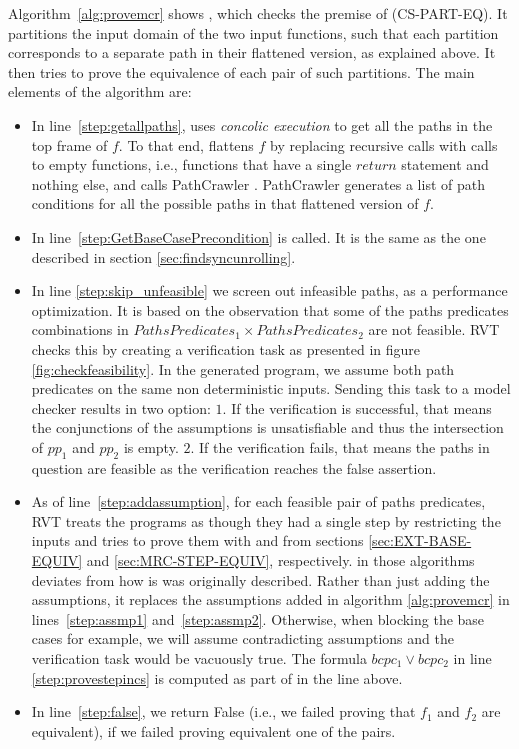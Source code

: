 Algorithm~\ref{alg:provemcr} shows 
, which checks the premise of (CS-PART-EQ). It partitions the input domain of the two input functions, such that each partition corresponds to a separate path in their flattened version, as explained above. It then tries to prove the equivalence of each pair of such partitions. The main elements of the algorithm are: 
\begin{itemize}
    \item In line~\ref{step:getallpaths},
     uses \emph{concolic execution} to get all the paths in the top frame of $f$. To that end,  flattens $f$ by replacing recursive calls with calls to empty functions, i.e., functions that have a single $return$ statement and nothing else, and calls PathCrawler \cite{10.1007/11408901_21}. PathCrawler generates a list of path conditions for all the possible paths in that flattened version of $f$.  
    \item In line~\ref{step:GetBaseCasePrecondition}  is called. It is the same as the one described in section \ref{sec:findsyncunrolling}.
    \item In line \ref{step:skip_unfeasible} we screen out infeasible paths, as a performance optimization. It is based on the observation that some of the paths predicates combinations in $PathsPredicates_1 \times PathsPredicates_2$ are not feasible. RVT checks this by creating a verification task as presented in figure \ref{fig:checkfeasibility}. In the generated program, we assume both path predicates on the same non deterministic inputs. Sending this task to a model checker results in two option: $1.$ If the verification is successful, that means the conjunctions of the assumptions is unsatisfiable and thus the intersection of $pp_1$ and $pp_2$ is empty. $2.$ If the verification fails, that means the paths in question are feasible as the verification reaches the false assertion.
    
    \item As of line~\ref{step:addassumption}, for each feasible pair of paths predicates, RVT treats the programs as though they had a single step by restricting the inputs and tries to prove them with  and  from sections \ref{sec:EXT-BASE-EQUIV} and \ref{sec:MRC-STEP-EQUIV}, respectively.  in those algorithms deviates from how is was originally described. Rather than just adding the assumptions, it replaces the assumptions added in algorithm \ref{alg:provemcr} in lines~\ref{step:assmp1} and~\ref{step:assmp2}. Otherwise, when blocking the base cases for example, we will assume contradicting assumptions and the verification task would be vacuously true. The formula $bcpc_1\lor bcpc_2$ in line \ref{step:provestepincs} is computed as part of   in the line above. 
    
    \item In line~\ref{step:false}, we return False (i.e., we failed proving that $f_1$ and $f_2$ are equivalent), if we failed proving equivalent one of the pairs. 
\end{itemize}

